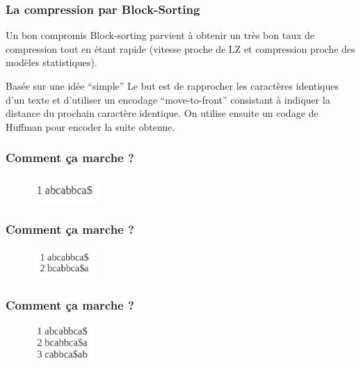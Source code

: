 \documentclass[10pt]{beamer}
\begin{document}
\begin{frame}
  \frametitle{La compression par Block-Sorting}

  \begin{block}{Un bon compromis}
    Block-sorting parvient à obtenir un très bon taux de compression
    tout en étant rapide (vitesse proche de LZ et compression proche
    des modèles statistiques\cite{Burrows94}).
  \end{block}

  \begin{block}{Basée sur une idée ``simple''}
    Le but est de rapprocher les caractères identiques d'un texte et
    d'utiliser un encodage ``move-to-front'' consistant à indiquer la
    distance du prochain caractère identique. On utilise ensuite un
    codage de Huffman pour encoder la suite obtenue.
  \end{block}


\end{frame}

\begin{frame}
  \frametitle{Comment ça marche ?}
  \begin{figure}
    \includegraphics[width=0.22\textwidth]{start_burrows}
  \end{figure}

\end{frame}

\begin{frame}
  \frametitle{Comment ça marche ?}
  \begin{figure}
    \includegraphics[width=0.21\textwidth]{1_burrows}
  \end{figure}

\end{frame}

\begin{frame}
  \frametitle{Comment ça marche ?}
  \begin{figure}
    \includegraphics[width=0.2\textwidth]{2_burrows}
  \end{figure}

\end{frame}
\end{document}
